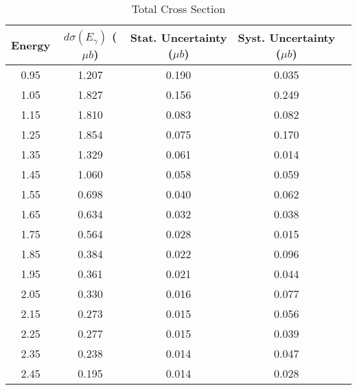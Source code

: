\begin{table}[h]
\centering
\caption{Total Cross Section}
\label{tab:diffcross1}
\begin{tabular}{|c|c|c|c|c|}
\hline
 {\bf Energy} &  {\bf $d\sigma(E_{\gamma})$ ($\mu b$)} & {\bf Stat. Uncertainty ($\mu b$)} & {\bf Syst. Uncertainty ($\mu b$)} \\ \hline
 0.95 &  1.207  &  0.190  &  0.035   \\ \hline
 1.05 &  1.827  &  0.156  &  0.249   \\ \hline
 1.15 &  1.810  &  0.083  &  0.082   \\ \hline
 1.25 &  1.854  &  0.075  &  0.170   \\ \hline
 1.35 &  1.329  &  0.061  &  0.014   \\ \hline
 1.45 &  1.060  &  0.058  &  0.059   \\ \hline
 1.55 &  0.698  &  0.040  &  0.062   \\ \hline
 1.65 &  0.634  &  0.032  &  0.038   \\ \hline
 1.75 &  0.564  &  0.028  &  0.015   \\ \hline
 1.85 &  0.384  &  0.022  &  0.096   \\ \hline
 1.95 &  0.361  &  0.021  &  0.044   \\ \hline
 2.05 &  0.330  &  0.016  &  0.077   \\ \hline
 2.15 &  0.273  &  0.015  &  0.056   \\ \hline
 2.25 &  0.277  &  0.015  &  0.039   \\ \hline
 2.35 &  0.238  &  0.014  &  0.047   \\ \hline
 2.45 &  0.195  &  0.014  &  0.028   \\ \hline
\end{tabular}
\end{table}
